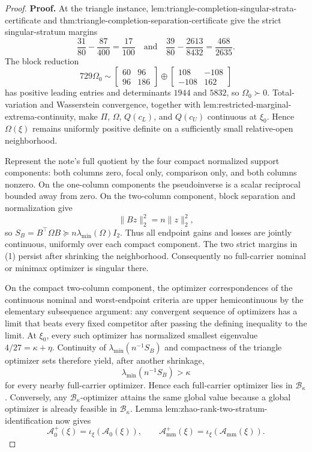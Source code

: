 \documentclass{article}
\begin{document}
\begin{proof}
\textbf{Proof.}
At the triangle instance, lem:triangle-completion-singular-strata-certificate and thm:triangle-completion-separation-certificate give the strict singular-stratum margins
\[
\frac{31}{80}-\frac{87}{400}=\frac{17}{100}
\quad\text{and}\quad
\frac{39}{80}-\frac{2613}{8432}=\frac{468}{2635}.
\tag{1}
\]
The block reduction
\[
729\Omega_0\sim
\begin{bmatrix}60&96\\96&186\end{bmatrix}
\oplus
\begin{bmatrix}108&-108\\-108&162\end{bmatrix}
\]
has positive leading entries and determinants \(1944\) and \(5832\), so \(\Omega_0\succ0\).  Total-variation and Wasserstein convergence, together with lem:restricted-marginal-extrema-continuity, make \(\Pi\), \(\Omega\), \(Q(c_L)\), and \(Q(c_U)\) continuous at \(\xi_0\).  Hence \(\Omega(\xi)\) remains uniformly positive definite on a sufficiently small relative-open neighborhood.

Represent the note's full quotient by the four compact normalized support components: both columns zero, focal only, comparison only, and both columns nonzero.  On the one-column components the pseudoinverse is a scalar reciprocal bounded away from zero.  On the two-column component, block separation and normalization give
\[
\lVert Bz\rVert_2^2=n\lVert z\rVert_2^2,
\]
so \(S_B=B^{\top}\Omega B\succeq n\lambda_{\min}(\Omega)I_2\).  Thus all endpoint gains and losses are jointly continuous, uniformly over each compact component.  The two strict margins in (1) persist after shrinking the neighborhood.  Consequently no full-carrier nominal or minimax optimizer is singular there.

On the compact two-column component, the optimizer correspondences of the continuous nominal and worst-endpoint criteria are upper hemicontinuous by the elementary subsequence argument: any convergent sequence of optimizers has a limit that beats every fixed competitor after passing the defining inequality to the limit.  At \(\xi_0\), every such optimizer has normalized smallest eigenvalue \(4/27=\kappa+\eta\).  Continuity of \(\lambda_{\min}(n^{-1}S_B)\) and compactness of the triangle optimizer sets therefore yield, after another shrinkage,
\[
\lambda_{\min}(n^{-1}S_B)>\kappa
\tag{2}
\]
for every nearby full-carrier optimizer.  Hence each full-carrier optimizer lies in \(\mathcal B_\kappa\).  Conversely, any \(\mathcal B_\kappa\)-optimizer attains the same global value because a global optimizer is already feasible in \(\mathcal B_\kappa\).  Lemma lem:zhao-rank-two-stratum-identification now gives
\[
\mathcal A_0^+(\xi)=\iota_\xi(\mathcal A_0(\xi)),
\qquad
\mathcal A_{\mathrm{mm}}^+(\xi)=\iota_\xi(\mathcal A_{\mathrm{mm}}(\xi)).
\tag{3}
\]


\end{proof}
\end{document}
